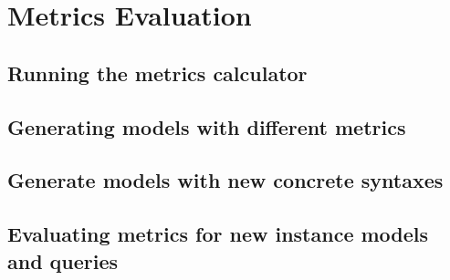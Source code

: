
\section{Metrics Evaluation}
\subsection{Running the metrics calculator}
\subsection{Generating models with different metrics} 
\subsection{Generate models with new concrete syntaxes}
\subsection{Evaluating metrics for new instance models and queries}

